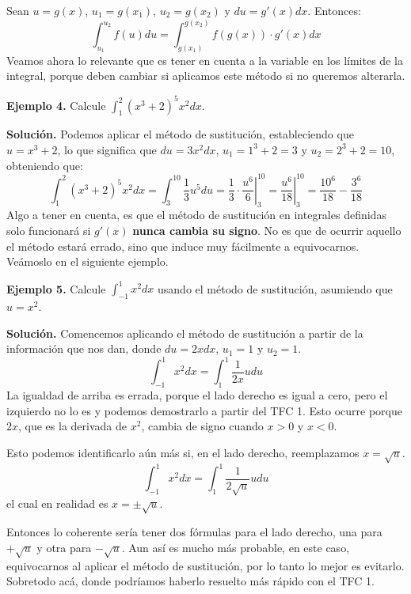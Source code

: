 \documentclass[12pt]{article}
\begin{document}
Sean $u = g(x)$, $u_{1} = g(x_{1})$, $u_{2} = g(x_{2})$ y $du = g'(x)dx$. Entonces:
\[
  \int_{u_{1}}^{u_{2}} f(u)du = \int_{g(x_{1})}^{g(x_{2})} f(g(x)) \cdot g'(x)dx
\]
Veamos ahora lo relevante que es tener en cuenta a la variable en los límites de la integral, porque deben cambiar si aplicamos este método si no queremos alterarla.

\textbf{Ejemplo 4.} \quad Calcule $\int_{1}^{2} (x^{3} + 2)^{5} x^{2} dx$.

\textbf{Solución.} \quad Podemos aplicar el método de sustitución, estableciendo que $u = x^{3} + 2$, lo que significa que $du = 3x^{2}dx$, $u_{1} = 1^{3} + 2 = 3$ y $u_{2} = 2^{3} + 2 = 10$, obteniendo que:
\[
  \int_{1}^{2} (x^{3} + 2)^{5} x^{2} dx = \int_{3}^{10} \frac{1}{3} u^{5}du
                                        = \frac{1}{3} \cdot \left.\frac{u^{6}}{6}\right|_{3}^{10}
                                        = \left.\frac{u^{6}}{18}\right|_{3}^{10}
                                        = \frac{10^{6}}{18} - \frac{3^{6}}{18}
\]
Algo a tener en cuenta, es que el método de sustitución en integrales definidas solo funcionará si $g'(x)$ \textbf{nunca cambia su signo}. No es que de ocurrir aquello el método estará errado, sino que induce muy fácilmente a equivocarnos. Veámoslo en el siguiente ejemplo.

\textbf{Ejemplo 5.} \quad Calcule $\int_{-1}^{1} x^{2}dx$ usando el método de sustitución, asumiendo que $u = x^{2}$.

\textbf{Solución.} \quad Comencemos aplicando el método de sustitución a partir de la información que nos dan, donde $du = 2xdx$, $u_{1} = 1$ y $u_{2} = 1$.
\[
  \int_{-1}^{1} x^{2}dx = \int_{1}^{1} \frac{1}{2x}udu
\]
La igualdad de arriba es errada, porque el lado derecho es igual a cero, pero el izquierdo no lo es y podemos demostrarlo a partir del TFC 1. Esto ocurre porque $2x$, que es la derivada de $x^{2}$, cambia de signo cuando $x > 0$ y $x < 0$.

Esto podemos identificarlo aún más si, en el lado derecho, reemplazamos $x = \sqrt{u}$.
\[
  \int_{-1}^{1} x^{2}dx = \int_{1}^{1} \frac{1}{2\sqrt{u}}udu
\]
el cual en realidad es $x = \pm \sqrt{u}$.

Entonces lo coherente sería tener dos fórmulas para el lado derecho, una para $+ \sqrt{u}$ y otra para $- \sqrt{u}$. Aun así es mucho más probable, en este caso, equivocarnos al aplicar el método de sustitución, por lo tanto lo mejor es evitarlo. Sobretodo acá, donde podríamos haberlo resuelto más rápido con el TFC 1.
\end{document}
